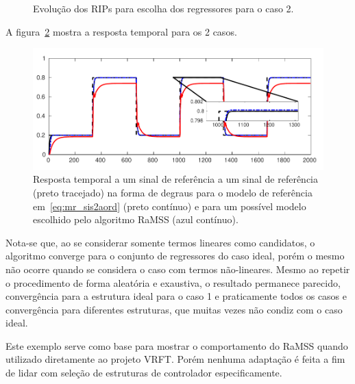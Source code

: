 \begin{exmp}
\begin{figure}[H]
  \caption{Evolução dos RIPs para escolha dos regressores para o caso 2.}
  \label{fig:sis2aord_RIPs_caso2}
\end{figure}



A figura~\ref{fig:Figs-RespostaSist2aordNARX-png} mostra a resposta temporal para os 2 casos.
\begin{figure}[H]
  \centering
  \includegraphics[width=1\textwidth]{Figs/sis2aord2-cropped.pdf}
  \caption{Resposta temporal a um sinal de referência a um sinal de referência (preto tracejado) na forma de degraus para o modelo de referência em~\eqref{eq:mr_sis2aord} (preto contínuo) e para um possível modelo escolhido pelo algoritmo RaMSS (azul contínuo).}
  \label{fig:Figs-RespostaSist2aordNARX-png}
\end{figure}


Nota-se que, ao se considerar somente termos lineares como candidatos, o algoritmo converge para o conjunto de regressores do caso ideal, porém o mesmo não ocorre quando se considera o caso com termos não-lineares. Mesmo ao repetir o procedimento de forma aleatória e exaustiva, o resultado permanece parecido, convergência para a estrutura ideal para o caso 1 e praticamente todos os casos e convergência para diferentes estruturas, que muitas vezes não condiz com o caso ideal.

Este exemplo serve como base para mostrar o comportamento do RaMSS quando utilizado diretamente ao projeto VRFT\@. Porém nenhuma adaptação é feita a fim de lidar com seleção de estruturas de controlador especificamente.

\end{exmp}


